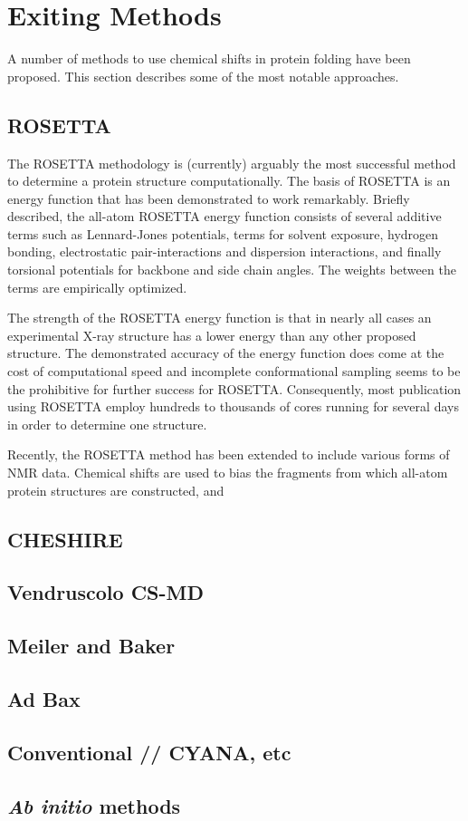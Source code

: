 \chapter{Exiting Methods}
A number of methods to use chemical shifts in protein folding have been proposed. This section describes some of the most notable approaches.

\section{ROSETTA}

The ROSETTA methodology is (currently) arguably the most successful method to determine a protein structure computationally.
The basis of ROSETTA is an energy function that has been demonstrated to work remarkably. Briefly described, the all-atom ROSETTA energy function consists of several additive terms such as Lennard-Jones potentials, terms for solvent exposure, hydrogen bonding, electrostatic pair-interactions and dispersion interactions, and finally torsional potentials for backbone and side chain angles.
The weights between the terms are empirically optimized.

The strength of the ROSETTA energy function is that in nearly all cases an experimental X-ray structure has a lower energy than any other proposed structure. The demonstrated accuracy of the energy function does come at the cost of computational speed and incomplete conformational sampling seems to be the prohibitive for further success for ROSETTA. Consequently, most publication using ROSETTA employ hundreds to thousands of cores running for several days in order to determine one structure.

Recently, the ROSETTA method has been extended to include various forms of NMR data. Chemical shifts are used to bias the fragments from which all-atom protein structures are constructed, and 

\section{CHESHIRE}

\section{Vendruscolo CS-MD}

\section{Meiler and Baker}

\section{Ad Bax}

\section{Conventional // CYANA, etc}

\section{\textit{Ab initio} methods}


